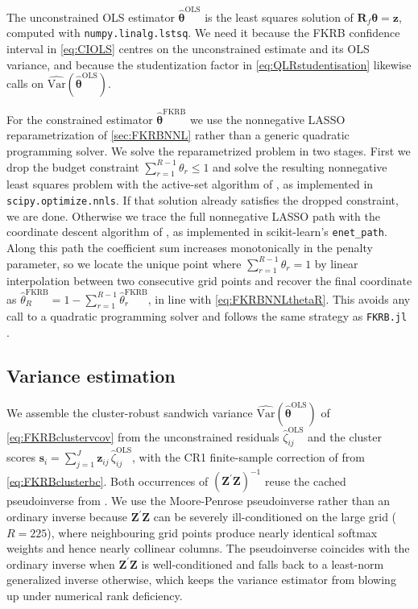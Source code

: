 The unconstrained OLS estimator $\hat{\bm{\theta}}^{\mathrm{OLS}}$ is the least squares solution of $\bm{R}_{\!f}\bm{\theta} = \bm{z}$, computed with \texttt{numpy.linalg.lstsq}.
We need it because the FKRB confidence interval in \cref{eq:CIOLS} centres on the unconstrained estimate and its OLS variance, and because the studentization factor in \cref{eq:QLRstudentisation} likewise calls on $\widehat{\mathrm{Var}}(\hat{\bm{\theta}}^{\mathrm{OLS}})$.

For the constrained estimator $\hat{\bm{\theta}}^{\mathrm{FKRB}}$ we use the nonnegative LASSO reparametrization of \cref{sec:FKRBNNL} rather than a generic quadratic programming solver.
We solve the reparametrized problem in two stages.
First we drop the budget constraint $\sum_{r=1}^{R-1}\theta_r \leq 1$ and solve the resulting nonnegative least squares problem with the active-set algorithm of \citet{LawsonHanson1995}, as implemented in \texttt{scipy.optimize.nnls}.
If that solution already satisfies the dropped constraint, we are done.
Otherwise we trace the full nonnegative LASSO path with the coordinate descent algorithm of \citet{FriedmanHastieTibshirani2010}, as implemented in scikit-learn's \texttt{enet\_path}.
Along this path the coefficient sum increases monotonically in the penalty parameter, so we locate the unique point where $\sum_{r=1}^{R-1}\theta_r = 1$ by linear interpolation between two consecutive grid points and recover the final coordinate as $\hat{\theta}_{R}^{\mathrm{FKRB}} = 1 - \sum_{r=1}^{R-1}\hat{\theta}_r^{\mathrm{FKRB}}$, in line with \cref{eq:FKRBNNLthetaR}.
This avoids any call to a quadratic programming solver and follows the same strategy as \texttt{FKRB.jl} \citep{Brand2023}.
\subsection{Variance estimation}
\label{sec:implementation:vcov}
We assemble the cluster-robust sandwich variance $\widehat{\mathrm{Var}}(\hat{\bm{\theta}}^{\mathrm{OLS}})$ of \cref{eq:FKRBclustervcov} from the unconstrained residuals $\hat{\zeta}^{\mathrm{OLS}}_{ij}$ and the cluster scores $\bm{s}_i = \sum_{j=1}^{J}\bm{z}_{ij}\,\hat{\zeta}^{\mathrm{OLS}}_{ij}$, with the CR1 finite-sample correction of \citet[][\S2.3]{CameronMiller2015} from \cref{eq:FKRBclusterbc}.
Both occurrences of $(\bm{Z}^\prime\bm{Z})^{-1}$ reuse the cached pseudoinverse from .
We use the Moore-Penrose pseudoinverse rather than an ordinary inverse because $\bm{Z}^\prime\bm{Z}$ can be severely ill-conditioned on the large grid ($R=225$), where neighbouring grid points produce nearly identical softmax weights and hence nearly collinear columns.
The pseudoinverse coincides with the ordinary inverse when $\bm{Z}^\prime\bm{Z}$ is well-conditioned and falls back to a least-norm generalized inverse otherwise, which keeps the variance estimator from blowing up under numerical rank deficiency.

